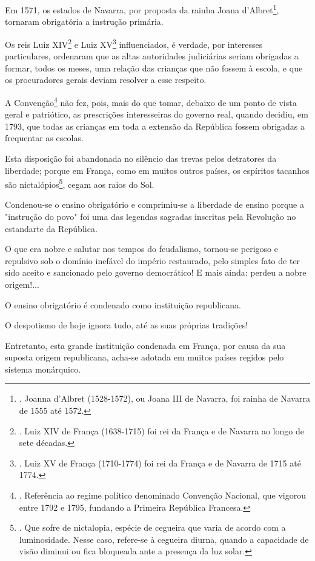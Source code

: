 Em 1571, os estados de Navarra, por proposta da rainha Joana
d'Albret\footnote{. Joanna d'Albret (1528-1572), ou Joana III de
  Navarra, foi rainha de Navarra de 1555 até 1572.}, tornaram
obrigatória a instrução primária.

Os reis Luiz XIV\footnote{. Luiz XIV de França (1638-1715) foi rei da
  França e de Navarra ao longo de sete décadas.} e Luiz XV\footnote{.
  Luiz XV de França (1710-1774) foi rei da França e de Navarra de 1715
  até 1774.} influenciados, é verdade, por interesses particulares,
ordenaram que as altas autoridades judiciárias seriam obrigadas a
formar, todos os meses, uma relação das crianças que não fossem à
escola, e que os procuradores gerais deviam resolver a esse respeito.

A Convenção\footnote{. Referência ao regime político denominado
  Convenção Nacional, que vigorou entre 1792 e 1795, fundando a Primeira
  República Francesa.} não fez, pois, mais do que tomar, debaixo de um
ponto de vista geral e patriótico, as prescrições interesseiras do
governo real, quando decidiu, em 1793, que todas as crianças em toda a
extensão da República fossem obrigadas a frequentar as escolas.

Esta disposição foi abandonada no silêncio das trevas pelos detratores
da liberdade; porque em França, como em muitos outros países, os
espíritos tacanhos são nictalópios\footnote{. Que sofre de nictalopia,
  espécie de cegueira que varia de acordo com a luminosidade. Nesse
  caso, refere-se à cegueira diurna, quando a capacidade de visão
  diminui ou fica bloqueada ante a presença da luz solar.}, cegam aos
raios do Sol.

Condenou-se o ensino obrigatório e comprimiu-se a liberdade de ensino
porque a "instrução do povo" foi uma das legendas sagradas inscritas
pela Revolução no estandarte da República.

O que era nobre e salutar nos tempos do feudalismo, tornou-se perigoso e
repulsivo sob o domínio inefável do império restaurado, pelo simples
fato de ter sido aceito e sancionado pelo governo democrático! E mais
ainda: perdeu a nobre origem!...

O ensino obrigatório é condenado como instituição republicana.

O despotismo de hoje ignora tudo, até as suas próprias tradições!

Entretanto, esta grande instituição condenada em França, por causa da
sua suposta origem republicana, acha-se adotada em muitos países regidos
pelo sistema monárquico.

